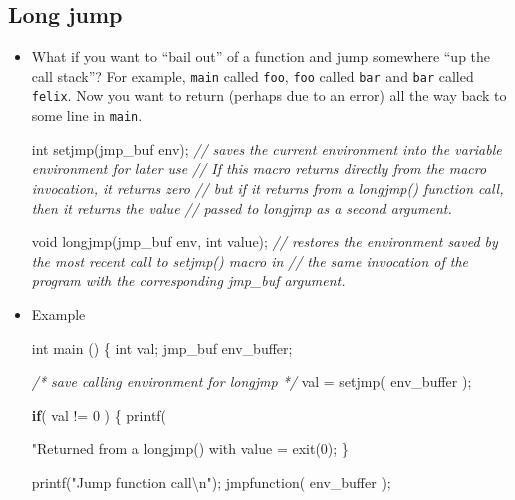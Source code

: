 \documentclass[]{article}
\newenvironment{Shaded}{}{}
\newcommand{\DataTypeTok}[1]{\textcolor[rgb]{0.56,0.13,0.00}{#1}}
\newcommand{\DecValTok}[1]{\textcolor[rgb]{0.25,0.63,0.44}{#1}}
\newcommand{\SpecialCharTok}[1]{\textcolor[rgb]{0.25,0.44,0.63}{#1}}
\newcommand{\StringTok}[1]{\textcolor[rgb]{0.25,0.44,0.63}{#1}}
\newcommand{\CommentTok}[1]{\textcolor[rgb]{0.38,0.63,0.69}{\textit{#1}}}
\newcommand{\ControlFlowTok}[1]{\textcolor[rgb]{0.00,0.44,0.13}{\textbf{#1}}}
\newcommand{\NormalTok}[1]{#1}
\begin{document}
\subsection{\texorpdfstring{\textbf{Long
jump}}{Long jump}}\label{header-n126}

\begin{itemize}
\item
  What if you want to ``bail out'' of a function and jump somewhere ``up
  the call stack''? For example, \texttt{main} called \texttt{foo},
  \texttt{foo} called \texttt{bar} and \texttt{bar} called
  \texttt{felix}. Now you want to return (perhaps due to an error) all
  the way back to some line in \texttt{main}.

\begin{Shaded}
\begin{Highlighting}[]
\DataTypeTok{int}\NormalTok{ setjmp(jmp_buf env);}
\CommentTok{// saves the current environment into the variable environment for later use}
\CommentTok{// If this macro returns directly from the macro invocation, it returns zero }
\CommentTok{// but if it returns from a longjmp() function call, then it returns the value}
\CommentTok{// passed to longjmp as a second argument.}

\DataTypeTok{void}\NormalTok{ longjmp(jmp_buf env, }\DataTypeTok{int}\NormalTok{ value);}
\CommentTok{// restores the environment saved by the most recent call to setjmp() macro in}
\CommentTok{// the same invocation of the program with the corresponding jmp_buf argument.}
\end{Highlighting}
\end{Shaded}
\item
  Example

\begin{Shaded}
\begin{Highlighting}[]
\DataTypeTok{int}\NormalTok{ main () \{}
   \DataTypeTok{int}\NormalTok{ val;}
\NormalTok{   jmp_buf env_buffer;}

   \CommentTok{/* save calling environment for longjmp */}
\NormalTok{   val = setjmp( env_buffer );}
   
   \ControlFlowTok{if}\NormalTok{( val != }\DecValTok{0}\NormalTok{ ) \{}
\NormalTok{      printf(}\StringTok{"Returned from a longjmp() with value = %s}\SpecialCharTok{\textbackslash{}n}\StringTok{"}\NormalTok{, val);}
\NormalTok{      exit(}\DecValTok{0}\NormalTok{);}
\NormalTok{   \}}
   
\NormalTok{   printf(}\StringTok{"Jump function call}\SpecialCharTok{\textbackslash{}n}\StringTok{"}\NormalTok{);}
\NormalTok{   jmpfunction( env_buffer );}
   
}
\end{Highlighting}
\end{Shaded}
\end{itemize}
\end{document}
